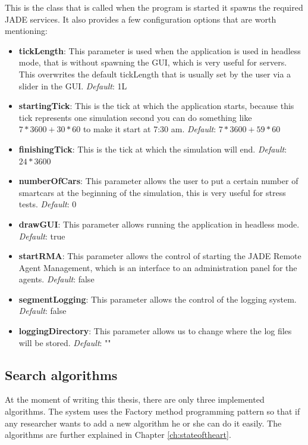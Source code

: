 This is the class that is called when the program is started it spawns the required JADE services. It also provides a few configuration options that are worth mentioning:

\begin{itemize}
\item \textbf{tickLength}: This parameter is used when the application is used in headless mode, that is without spawning the GUI, which is very useful for servers. This overwrites the default tickLength that is usually set by the user via a slider in the GUI. \textit{Default}: 1L
\item \textbf{startingTick}: This is the tick at which the application starts, because this tick represents one simulation second you can do something like $7*3600 + 30*60$ to make it start at 7:30 am. \textit{Default}: $7*3600 + 59*60$
\item \textbf{finishingTick}: This is the tick at which the simulation will end. \textit{Default}: $24*3600$
\item \textbf{numberOfCars}: This parameter allows the user to put a certain number of smartcars at the beginning of the simulation, this is very useful for stress tests. \textit{Default}: 0
\item \textbf{drawGUI}: This parameter allows running the application in headless mode. \textit{Default}: true
\item \textbf{startRMA}: This parameter allows the control of starting the JADE Remote Agent Management, which is an interface to an administration panel for the agents. \textit{Default}: false
\item \textbf{segmentLogging}: This parameter allows the control of the logging system. \textit{Default}: false
\item \textbf{loggingDirectory}: This parameter allows us to change where the log files will be stored. \textit{Default}: ""
\end{itemize}

\subsection{Search algorithms}

At the moment of writing this thesis, there are only three implemented algorithms. The system uses the Factory method programming pattern \cite{wikipedia_factory} so that if any researcher wants to add a new algorithm he or she can do it easily. The algorithms are further explained in Chapter \ref{ch:stateoftheart}.

